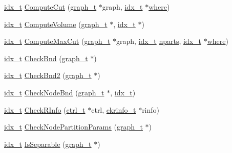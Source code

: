 \begin{DoxyCompactItemize}
\item 
\hyperlink{a00876_aaa5262be3e700770163401acb0150f52}{idx\+\_\+t} \hyperlink{a00945_a99abc93df5d5bca5819ed55a767c4e0e}{Compute\+Cut} (\hyperlink{a00734}{graph\+\_\+t} $\ast$graph, \hyperlink{a00876_aaa5262be3e700770163401acb0150f52}{idx\+\_\+t} $\ast$\hyperlink{a00879_a7a355801f721e9d8d4ae03590a3a56b0}{where})
\item 
\hyperlink{a00876_aaa5262be3e700770163401acb0150f52}{idx\+\_\+t} \hyperlink{a00945_ae79bf6d99689af2bbe6145846a42e31d}{Compute\+Volume} (\hyperlink{a00734}{graph\+\_\+t} $\ast$, \hyperlink{a00876_aaa5262be3e700770163401acb0150f52}{idx\+\_\+t} $\ast$)
\item 
\hyperlink{a00876_aaa5262be3e700770163401acb0150f52}{idx\+\_\+t} \hyperlink{a00945_a2c579207b8d0c26ec7e5bebbdceaa73d}{Compute\+Max\+Cut} (\hyperlink{a00734}{graph\+\_\+t} $\ast$graph, \hyperlink{a00876_aaa5262be3e700770163401acb0150f52}{idx\+\_\+t} \hyperlink{a00879_aad88065af88fd6759101788a8e15ce9e}{nparts}, \hyperlink{a00876_aaa5262be3e700770163401acb0150f52}{idx\+\_\+t} $\ast$\hyperlink{a00879_a7a355801f721e9d8d4ae03590a3a56b0}{where})
\item 
\hyperlink{a00876_aaa5262be3e700770163401acb0150f52}{idx\+\_\+t} \hyperlink{a00945_a441777159a737edb038e14d7f6757382}{Check\+Bnd} (\hyperlink{a00734}{graph\+\_\+t} $\ast$)
\item 
\hyperlink{a00876_aaa5262be3e700770163401acb0150f52}{idx\+\_\+t} \hyperlink{a00945_aee6f89ea1f2d4ee14be5a298539121ca}{Check\+Bnd2} (\hyperlink{a00734}{graph\+\_\+t} $\ast$)
\item 
\hyperlink{a00876_aaa5262be3e700770163401acb0150f52}{idx\+\_\+t} \hyperlink{a00945_ae7d4f14c32e15f9aeb0e284494da06c6}{Check\+Node\+Bnd} (\hyperlink{a00734}{graph\+\_\+t} $\ast$, \hyperlink{a00876_aaa5262be3e700770163401acb0150f52}{idx\+\_\+t})
\item 
\hyperlink{a00876_aaa5262be3e700770163401acb0150f52}{idx\+\_\+t} \hyperlink{a00945_adb0cfc48ae3464b6fab963903edc0420}{Check\+R\+Info} (\hyperlink{a00742}{ctrl\+\_\+t} $\ast$ctrl, \hyperlink{a00718}{ckrinfo\+\_\+t} $\ast$rinfo)
\item 
\hyperlink{a00876_aaa5262be3e700770163401acb0150f52}{idx\+\_\+t} \hyperlink{a00945_a83201bd720c3e6b74bf0898580a1f1dc}{Check\+Node\+Partition\+Params} (\hyperlink{a00734}{graph\+\_\+t} $\ast$)
\item 
\hyperlink{a00876_aaa5262be3e700770163401acb0150f52}{idx\+\_\+t} \hyperlink{a00945_a4e20e266d94786939fcf423ec9dbe785}{Is\+Separable} (\hyperlink{a00734}{graph\+\_\+t} $\ast$)

\end{DoxyCompactItemize}
